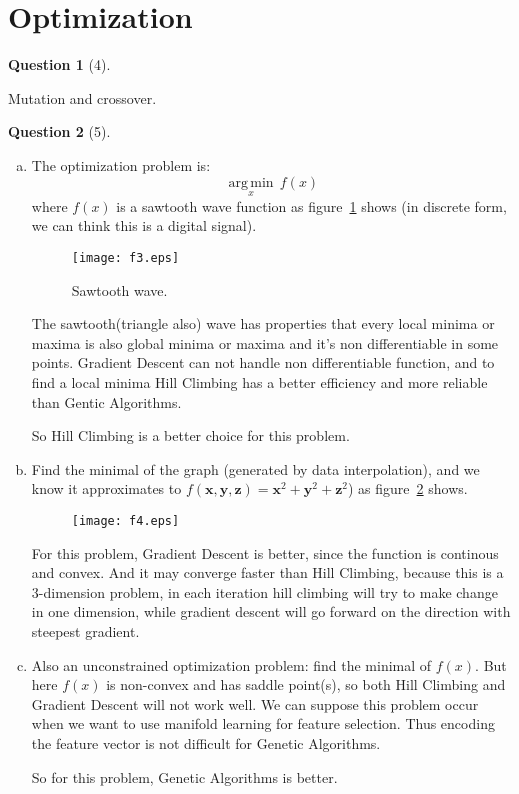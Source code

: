 \documentclass{article}
\theoremstyle{quest}
\newtheorem*{question}{Question}
\begin{document}
\section*{Optimization}
\begin{question}[4]
\end{question}
Mutation and crossover.
\begin{question}[5]
\end{question}
\begin{enumerate}[a.]
\item
The optimization problem is:
$${\underset  {x}{\operatorname {arg\,min}}}\,f(x)$$
where $f(x)$ is a sawtooth wave function as figure~\ref{f3} shows (in discrete form, we can think this is a digital signal).\\
\begin{figure}[h!]
\centering
\texttt{[image: f3.eps]}
\caption{Sawtooth wave.} \label{f3}
\end{figure}
The sawtooth(triangle also) wave has properties that every local minima or maxima is also global minima or maxima and it's non differentiable in some points. Gradient Descent can not handle non differentiable function, and to find a local minima Hill Climbing has a better efficiency and more reliable than Gentic Algorithms. 

So Hill Climbing is a better choice for this problem.
\item
Find the minimal of the graph (generated by data interpolation), and we know it approximates to $f(\mathbf{x,y,z}) =\mathbf{x}^2+\mathbf{y}^2+\mathbf{z}^2$) as figure~\ref{f4} shows. \\
\begin{figure}[h!]
\centering
\texttt{[image: f4.eps]}
\caption{} \label{f4}
\end{figure}

For this problem, Gradient Descent is better, since the function is continous and convex. And it may converge faster than Hill Climbing, because this is a 3-dimension problem, in each iteration hill climbing will try to make change in one dimension, while gradient descent will go forward on the direction with steepest gradient.
\item
Also an unconstrained optimization problem: find the minimal of $f(x)$. But here $f(x)$ is non-convex and has saddle point(s), so both Hill Climbing and Gradient Descent will not work well. We can suppose this problem occur when we want to use manifold learning for feature selection. Thus encoding the feature vector is not difficult for Genetic Algorithms. 

So for this problem, Genetic Algorithms is better.
\end{enumerate}
\end{document}
